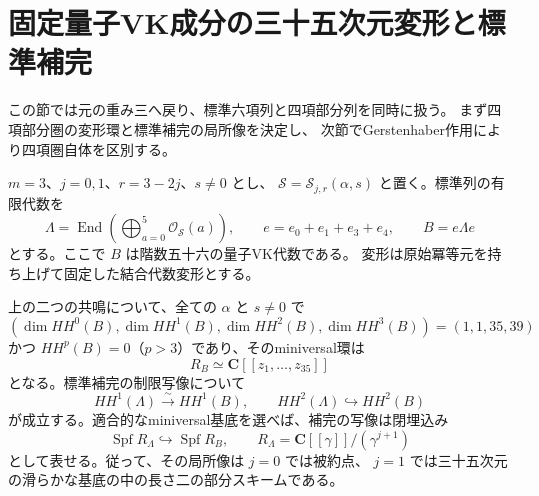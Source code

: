 \section{固定量子VK成分の三十五次元変形と標準補完}
\label{sec:quantum-vk-corners-v35}

この節では元の重み三へ戻り、標準六項列と四項部分列を同時に扱う。
まず四項部分圏の変形環と標準補完の局所像を決定し、
次節でGerstenhaber作用により四項圏自体を区別する。

$m=3$、$j=0,1$、$r=3-2j$、$s\ne0$ とし、
$\mathcal S=\mathcal S_{j,r}(\alpha,s)$ と置く。標準列の有限代数を
\[
 \Lambda=\operatorname{End}\left(\bigoplus_{a=0}^{5}\mathcal O_{\mathcal S}(a)\right),
 \qquad e=e_0+e_1+e_3+e_4,\qquad B=e\Lambda e
\]
とする。ここで $B$ は階数五十六の量子VK代数である。
変形は原始冪等元を持ち上げて固定した結合代数変形とする。

\begin{theorem}[固定量子VK代数と標準補完の局所環]
\label{thm:quantum-vk-hull-v35}
上の二つの共鳴について、全ての $\alpha$ と $s\ne0$ で
\[
 (\dim HH^0(B),\dim HH^1(B),\dim HH^2(B),\dim HH^3(B))
       =(1,1,35,39)
\]
かつ $HH^p(B)=0$（$p>3$）であり、そのminiversal環は
\[
 \boxed{R_B\simeq\mathbf C[[z_1,\ldots,z_{35}]]}
\]
となる。標準補完の制限写像について
\[
 HH^1(\Lambda)\xrightarrow{\sim}HH^1(B),\qquad
 HH^2(\Lambda)\hookrightarrow HH^2(B)
\]
が成立する。適合的なminiversal基底を選べば、補完の写像は閉埋込み
\[
 \operatorname{Spf}R_\Lambda\hookrightarrow\operatorname{Spf}R_B,
 \qquad R_\Lambda=\mathbf C[[\gamma]]/(\gamma^{j+1})
\]
として表せる。従って、その局所像は $j=0$ では被約点、
$j=1$ では三十五次元の滑らかな基底の中の長さ二の部分スキームである。
\end{theorem}

